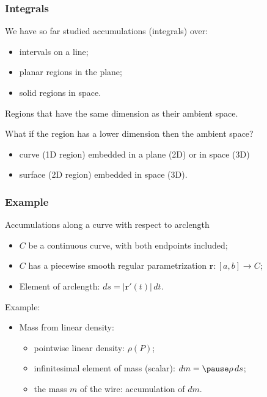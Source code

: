 \begin{frame}
  \frametitle{Integrals}

  We have so far studied accumulations (integrals) over:
  \begin{itemize}
    \item intervals on a line;
    \item planar regions in the plane;
    \item solid regions in space.
  \end{itemize}
  Regions that have the same dimension as their ambient space.

  \bigskip
  What if the region has a lower dimension then the ambient space?
  \begin{itemize}
    \item curve (1D region) embedded in a plane (2D) or in space (3D)
    \item surface (2D region) embedded in space (3D).
  \end{itemize}
\end{frame}

\begin{frame}
  \frametitle{Example}
  Accumulations along a curve \textcolor[rgb]{0.98,0.00,0.00}{with respect to arclength}

  \begin{itemize}
    \item $C$ be a continuous curve, with both endpoints included;
    \item $C$ has a piecewise smooth regular parametrization $\textbf{r}\colon [a,b]\to C$;
    \item Element of arclength: $ds= |\textbf{r}'(t)|\, dt$.
  \end{itemize}

\pause   Example:
  \begin{itemize}
    \item Mass from linear density:
    \begin{itemize}
      \item \pause pointwise linear density: $\rho(P)$;
      \item \pause infinitesimal element of mass (scalar): $dm = \pause \rho\, ds$;
      \item \pause the mass $m$ of the wire: accumulation of $dm$.
    \end{itemize}
  \end{itemize}
\end{frame}

